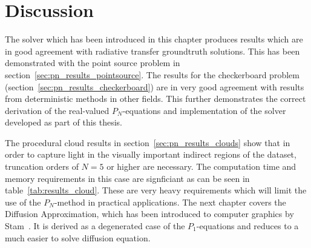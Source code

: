 \section{Discussion}

The solver which has been introduced in this chapter produces results which are in good agreement with radiative transfer groundtruth solutions. This has been demonstrated with the point source problem in section~\ref{sec:pn_results_pointsource}. The results for the checkerboard problem (section~\ref{sec:pn_results_checkerboard}) are in very good agreement with results from deterministic methods in other fields. This further demonstrates the correct derivation of the real-valued $P_N$-equations and implementation of the solver developed as part of this thesis.

The procedural cloud results in section~\ref{sec:pn_results_clouds} show that in order to capture light in the visually important indirect regions of the dataset, truncation orders of $N=5$ or higher are necessary. The computation time and memory requirements in this case are signficiant as can be seen in table~\ref{tab:results_cloud}. These are very heavy requirements which will limit the use of the $P_N$-method in practical applications. The next chapter covers the Diffusion Approximation, which has been introduced to computer graphics by Stam~\cite{Stam95}. It is derived as a degenerated case of the $P_1$-equations and reduces to a much easier to solve diffusion equation.

